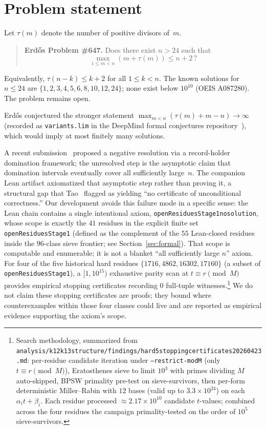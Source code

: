 \documentclass[11pt]{article}
\renewcommand{\_}{\origunderscore\allowbreak}
\theoremstyle{definition}
\theoremstyle{remark}
\begin{document}
\tableofcontents

\section{Problem statement}\label{sec:problem}

Let $\tau(m)$ denote the number of positive divisors of~$m$.

\begin{quote}
\textbf{Erd\H{o}s Problem \#647.} Does there exist $n>24$ such that
\[
  \max_{1\le m<n}(m+\tau(m))\le n+2\,?
\]
\end{quote}

Equivalently, $\tau(n-k)\le k+2$ for all $1\le k<n$. The known
solutions for $n\le 24$ are $\{1,2,3,4,5,6,8,10,12,24\}$; none
exist below $10^{10}$ (OEIS A087280). The problem remains open.

Erd\H{o}s conjectured the stronger statement
$\max_{m<n}(\tau(m)+m-n)\to\infty$ (recorded as
\texttt{variants.lim} in the DeepMind formal conjectures
repository~\cite{DeepMind}), which would imply at most finitely
many solutions.

A recent submission~\cite{Agbanwa} proposed a negative resolution via
a record-holder domination framework; the unresolved step is the
asymptotic claim that domination intervals eventually cover all
sufficiently large~$n$. The companion Lean artifact
axiomatized that asymptotic step rather than proving it, a
structural gap that Tao~\cite{TaoForum647} flagged as yielding
``no certificate of unconditional correctness.'' Our development
avoids this failure mode in a specific sense: the Lean chain contains a
single intentional axiom, \texttt{openResiduesStage1\_no\_solution},
whose scope is exactly the $41$ residues in the explicit finite set
\texttt{openResiduesStage1} (defined as the complement of the $55$
Lean-closed residues inside the $96$-class sieve frontier; see
Section~\ref{sec:formal}). That scope is computable and enumerable;
it is not a blanket ``all sufficiently large $n$'' axiom.
For four of the five historical hard residues
$\{1716, 4862, 16302, 17160\}$ (a subset of
\texttt{openResiduesStage1}), a $[1, 10^{15})$ exhaustive parity scan
at $t \equiv r \pmod{M}$ provides empirical stopping certificates
recording $0$ full-tuple witnesses.\footnote{Search methodology,
summarized from
\texttt{analysis/k12\_k13\_structure/findings/hard5\_stopping\_certificates\_20260423.md}:
per-residue candidate iteration under \texttt{--restrict-modM}
(only $t\equiv r\pmod{M}$), Eratosthenes sieve to limit $10^3$ with
primes dividing $M$ auto-skipped, BPSW primality pre-test on
sieve-survivors, then per-form deterministic Miller--Rabin with
$12$ bases (valid up to $3.3\times 10^{24}$) on each $\alpha_i t +
\beta_i$. Each residue processed $\approx 2.17\times 10^{10}$
candidate $t$-values; combined across the four residues the campaign
primality-tested on the order of $10^{5}$ sieve-survivors.}
We do not claim these stopping certificates are proofs; they bound
where counterexamples within those four classes could live and are
reported as empirical evidence supporting the axiom's scope.
\end{document}
